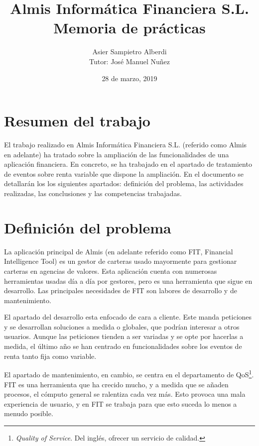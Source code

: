 \documentclass[titlepage]{article}
\title{
   Almis Informática Financiera S.L.\\
    \textbf{Memoria de prácticas}
}
\author{
    Asier Sampietro Alberdi\\
    Tutor: José Manuel Nuñez
}
\date{28 de marzo, 2019}
\begin{document}
\begin{titlepage}
\maketitle
\end{titlepage}

\section*{Resumen del trabajo}
El trabajo realizado en Almis Informática Financiera S.L. (referido como Almis en
adelante) ha tratado sobre la ampliación de las funcionalidades de una aplicación
financiera. En concreto, se ha trabajado en el apartado de tratamiento de eventos
sobre renta variable que dispone la ampliación. En el documento se detallarán los
los siguientes apartados: definición del problema, las actividades realizadas, las
conclusiones y las competencias trabajadas.
\newpage

\tableofcontents
\newpage
\listoffigures
\newpage

\section{Definición del problema}
La aplicación principal de Almis (en adelante referido como FIT, Financial Intelligence Tool) es un gestor de carteras usado mayormente para gestionar carteras en agencias de valores. Esta aplicación cuenta con numerosas herramientas usadas día a día por gestores, pero es una herramienta que sigue en desarrollo. Las principales necesidades de FIT son labores de desarrollo y de mantenimiento.\par

El apartado del desarrollo esta enfocado de cara a cliente. Este manda peticiones y se desarrollan soluciones a medida o globales, que podrían interesar a otros usuarios. Aunque las peticiones tienden a ser variadas y se opte por hacerlas a medida, el último año se han centrado en funcionalidades sobre los eventos de renta tanto fija como variable.\par

El apartado de mantenimiento, en cambio, se centra en el departamento de QoS\footnote{\emph{Quality of Service}. Del inglés, ofrecer un servicio de calidad.}. FIT es una herramienta que ha crecido mucho, y a medida que se añaden procesos, el cómputo general se ralentiza cada vez más. Esto provoca una mala experiencia de usuario, y en FIT se trabaja para que esto suceda lo menos a menudo posible.
\end{document}
